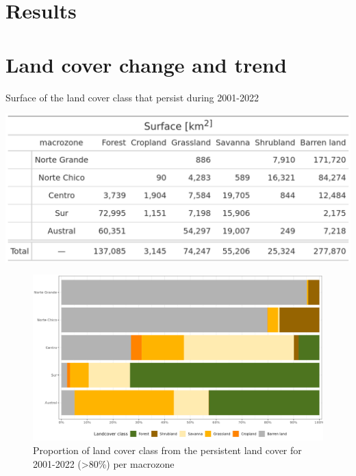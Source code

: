 \documentclass[
  authoryear,
  preprint,
  3p,
  onecolumn]{elsarticle}
\begin{document}
\hypertarget{results}{%
\section{Results}\label{results}}

\hypertarget{land-cover-change-and-trend-1}{%
\section{Land cover change and
trend}\label{land-cover-change-and-trend-1}}

\begin{table}[!ht]
\caption{Surface of the land cover class that persist during 2001-2022}
\label{tab-landcoverSurf}
\includegraphics[width = .5\textwidth]{../output/figs/table_surface_landcover_macrozone.png}
\end{table}

\begin{figure}[!ht]

{\centering \includegraphics{../output/figs/LC_pers80_per_macrozone.png}

}

\caption{\label{fig-LCprop}Proportion of land cover class from the
persistent land cover for 2001-2022 (\textgreater80\%) per macrozone}

\end{figure}
\end{document}
